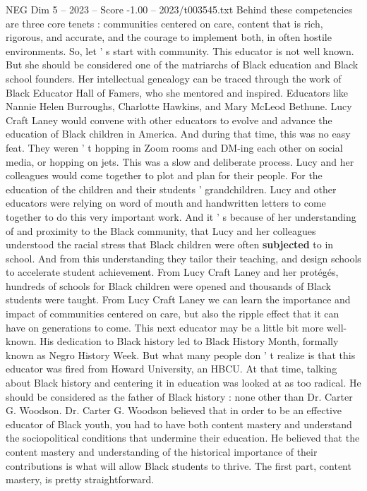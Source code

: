 \begin{textsample}{NEG Dim 5 – 2023 – Score -1.00 – 2023/t003545.txt}
Behind these competencies are three core tenets : communities centered on care, content that is rich, rigorous, and accurate, and the courage to implement both, in often hostile environments.
So, let ' s start with community.
This educator is not well known.
But she should be considered one of the matriarchs of Black education and Black school founders.
Her intellectual genealogy can be traced through the work of Black Educator Hall of Famers, who she mentored and inspired.
Educators like Nannie Helen Burroughs, Charlotte Hawkins, and Mary McLeod Bethune.
Lucy Craft Laney would convene with other educators to evolve and advance the education of Black children in America.
And during that time, this was no easy feat.
They weren ' t hopping in Zoom rooms and DM-ing each other on social media, or hopping on jets.
This was a slow and deliberate process.
Lucy and her colleagues would come together to plot and plan for their people.
For the education of the children and their students ' grandchildren.
Lucy and other educators were relying on word of mouth and handwritten letters to come together to do this very important work.
And it ' s because of her understanding of and proximity to the Black community, that Lucy and her colleagues understood the racial stress that Black children were often \textbf{subjected} to in school.
And from this understanding they tailor their teaching, and design schools to accelerate student achievement.
From Lucy Craft Laney and her protégés, hundreds of schools for Black children were opened and thousands of Black students were taught.
From Lucy Craft Laney we can learn the importance and impact of communities centered on care, but also the ripple effect that it can have on generations to come.
This next educator may be a little bit more well-known.
His dedication to Black history led to Black History Month, formally known as Negro History Week.
But what many people don ' t realize is that this educator was fired from Howard University, an HBCU.
At that time, talking about Black history and centering it in education was looked at as too radical.
He should be considered as the father of Black history : none other than Dr.
Carter G.
Woodson.
Dr.
Carter G.
Woodson believed that in order to be an effective educator of Black youth, you had to have both content mastery and understand the sociopolitical conditions that undermine their education.
He believed that the content mastery and understanding of the historical importance of their contributions is what will allow Black students to thrive.
The first part, content mastery, is pretty straightforward.

\end{textsample}
